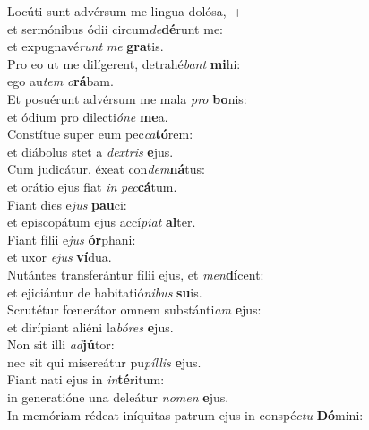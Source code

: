 \evenverse Locúti sunt advérsum me lingua dolósa,~+\\\evenverse  et sermónibus ódii circum\textit{de}\textbf{dé}runt me:~\*\\
\evenverse et expugnavé\textit{runt} \textit{me} \textbf{gra}tis.\\
\oddverse Pro eo ut me dilígerent, detrahé\textit{bant} \textbf{mi}hi:~\*\\
\oddverse ego au\textit{tem} \textit{o}\textbf{rá}bam.\\
\evenverse Et posuérunt advérsum me mala \textit{pro} \textbf{bo}nis:~\*\\
\evenverse et ódium pro dilecti\textit{ó}\textit{ne} \textbf{me}a.\\
\oddverse Constítue super eum pec\textit{ca}\textbf{tó}rem:~\*\\
\oddverse et diábolus stet a \textit{dex}\textit{tris} \textbf{e}jus.\\
\evenverse Cum judicátur, éxeat con\textit{dem}\textbf{ná}tus:~\*\\
\evenverse et orátio ejus fiat \textit{in} \textit{pec}\textbf{cá}tum.\\
\oddverse Fiant dies e\textit{jus} \textbf{pau}ci:~\*\\
\oddverse et episcopátum ejus accí\textit{pi}\textit{at} \textbf{al}ter.\\
\evenverse Fiant fílii e\textit{jus} \textbf{ór}phani:~\*\\
\evenverse et uxor \textit{e}\textit{jus} \textbf{ví}dua.\\
\oddverse Nutántes transferántur fílii ejus, et \textit{men}\textbf{dí}cent:~\*\\
\oddverse et ejiciántur de habitatió\textit{ni}\textit{bus} \textbf{su}is.\\
\evenverse Scrutétur fœnerátor omnem substánti\textit{am} \textbf{e}jus:~\*\\
\evenverse et dirípiant aliéni la\textit{bó}\textit{res} \textbf{e}jus.\\
\oddverse Non sit illi \textit{ad}\textbf{jú}tor:~\*\\
\oddverse nec sit qui misereátur pu\textit{píl}\textit{lis} \textbf{e}jus.\\
\evenverse Fiant nati ejus in \textit{in}\textbf{té}ritum:~\*\\
\evenverse in generatióne una deleátur \textit{no}\textit{men} \textbf{e}jus.\\
\oddverse In memóriam rédeat iníquitas patrum ejus in conspé\textit{ctu} \textbf{Dó}mini:~\*\\
